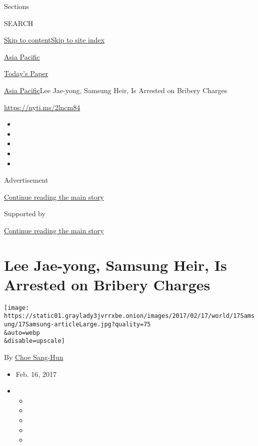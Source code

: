 Sections

SEARCH

\protect\hyperlink{site-content}{Skip to
content}\protect\hyperlink{site-index}{Skip to site index}

\href{https://www.nytimes3xbfgragh.onion/section/world/asia}{Asia
Pacific}

\href{https://myaccount.nytimes3xbfgragh.onion/auth/login?response_type=cookie\&client_id=vi}{}

\href{https://www.nytimes3xbfgragh.onion/section/todayspaper}{Today's
Paper}

\href{/section/world/asia}{Asia Pacific}\textbar{}Lee Jae-yong, Samsung
Heir, Is Arrested on Bribery Charges

\url{https://nyti.ms/2lncm84}

\begin{itemize}
\item
\item
\item
\item
\item
\end{itemize}

Advertisement

\protect\hyperlink{after-top}{Continue reading the main story}

Supported by

\protect\hyperlink{after-sponsor}{Continue reading the main story}

\hypertarget{lee-jae-yong-samsung-heir-is-arrested-on-bribery-charges}{%
\section{Lee Jae-yong, Samsung Heir, Is Arrested on Bribery
Charges}\label{lee-jae-yong-samsung-heir-is-arrested-on-bribery-charges}}

\texttt{[image: https://static01.graylady3jvrrxbe.onion/images/2017/02/17/world/17Samsung/17Samsung-articleLarge.jpg?quality=75\\\&auto=webp\\\&disable=upscale]}

By \href{http://www.nytimes3xbfgragh.onion/by/choe-sang-hun}{Choe
Sang-Hun}

\begin{itemize}
\item
  Feb. 16, 2017
\item
  \begin{itemize}
  \item
  \item
  \item
  \item
  \item
  \end{itemize}
\end{itemize}

